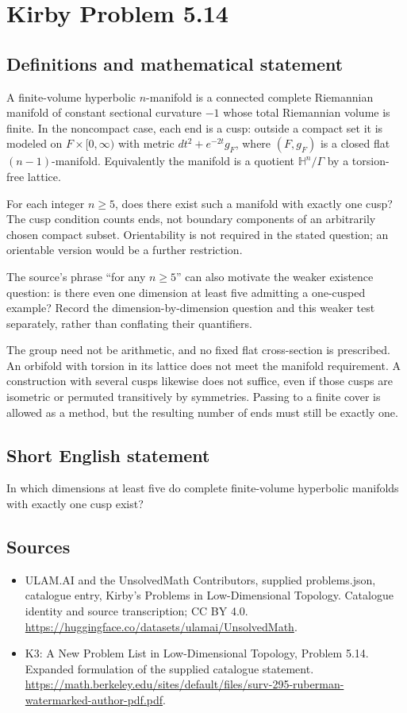 \documentclass[11pt,a4paper]{article}
\begin{document}
\section*{Kirby Problem 5.14}\label{statement}

\subsection{Definitions and mathematical statement}
A finite-volume hyperbolic $n$-manifold is a connected complete Riemannian manifold of constant sectional curvature $-1$ whose total Riemannian volume is finite. In the noncompact case, each end is a cusp: outside a compact set it is modeled on $F\times[0,\infty)$ with metric $dt^2+e^{-2t}g_F$, where $(F,g_F)$ is a closed flat $(n-1)$-manifold. Equivalently the manifold is a quotient $\mathbb H^n/\Gamma$ by a torsion-free lattice.

For each integer $n\ge5$, does there exist such a manifold with exactly one cusp? The cusp condition counts ends, not boundary components of an arbitrarily chosen compact subset. Orientability is not required in the stated question; an orientable version would be a further restriction.

The source's phrase ``for any $n\ge5$'' can also motivate the weaker existence question: is there even one dimension at least five admitting a one-cusped example? Record the dimension-by-dimension question and this weaker test separately, rather than conflating their quantifiers.

The group need not be arithmetic, and no fixed flat cross-section is prescribed. An orbifold with torsion in its lattice does not meet the manifold requirement. A construction with several cusps likewise does not suffice, even if those cusps are isometric or permuted transitively by symmetries. Passing to a finite cover is allowed as a method, but the resulting number of ends must still be exactly one.
\subsection{Short English statement}
In which dimensions at least five do complete finite-volume hyperbolic manifolds with exactly one cusp exist?
\subsection{Sources}
\begin{itemize}
\item[S1] ULAM.AI and the UnsolvedMath Contributors, supplied problems.json, catalogue entry, Kirby's Problems in Low-Dimensional Topology. Catalogue identity and source transcription; CC BY 4.0.
\url{https://huggingface.co/datasets/ulamai/UnsolvedMath}.
\item[S2] K3: A New Problem List in Low-Dimensional Topology, Problem 5.14. Expanded formulation of the supplied catalogue statement.
\url{https://math.berkeley.edu/sites/default/files/surv-295-ruberman-watermarked-author-pdf.pdf}.
\end{itemize}
\end{document}
